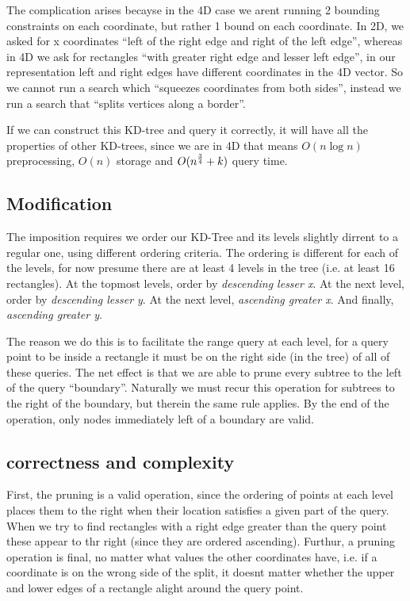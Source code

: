 The complication arises becayse in the 4D case we arent running 2 bounding constraints on each coordinate, but rather 1 bound on each coordinate.
In 2D, we asked for x coordinates ``left of the right edge and right of the left edge'', whereas in 4D we ask for rectangles ``with greater right edge and lesser left edge'', in our representation left and right edges have different coordinates in the 4D vector.
So we cannot run a search which ``squeezes coordinates from both sides'', instead we run a search that ``splits vertices along a border''.

If we can construct this KD-tree and query it correctly, it will have all the properties of other KD-trees, since we are in 4D that means $O(n \log n)$ preprocessing, $O(n)$ storage and $O(n^{3 \over 4} + k)$ query time.

\subsection{Modification}
The imposition requires we order our KD-Tree and its levels slightly dirrent to a regular one, using different ordering criteria.
The ordering is different for each of the levels, for now presume there are at least 4 levels in the tree (i.e. at least 16 rectangles).
At the topmost levels, order by {\em descending lesser x}.
At the next level, order by {\em descending lesser y}.
At the next level, {\em ascending greater x}.
And finally, {\em ascending greater y}.

The reason we do this is to facilitate the range query at each level, for a query point to be inside a rectangle it must be on the right side (in the tree) of all of these queries.
The net effect is that we are able to prune every subtree to the left of the query ``boundary''.
Naturally we must recur this operation for subtrees to the right of the boundary, but therein the same rule applies.
By the end of the operation, only nodes immediately left of a boundary are valid.

\subsection{correctness and complexity}
First, the pruning is a valid operation, since the ordering of points at each level places them to the right when their location satisfies a given part of the query.
When we try to find rectangles with a right edge greater than the query point these appear to thr right (since they are ordered ascending).
Furthur, a pruning operation is final, no matter what values the other coordinates have, i.e. if a coordinate is on the wrong side of the split, it doesnt matter whether the upper and lower edges of a rectangle alight around the query point.

